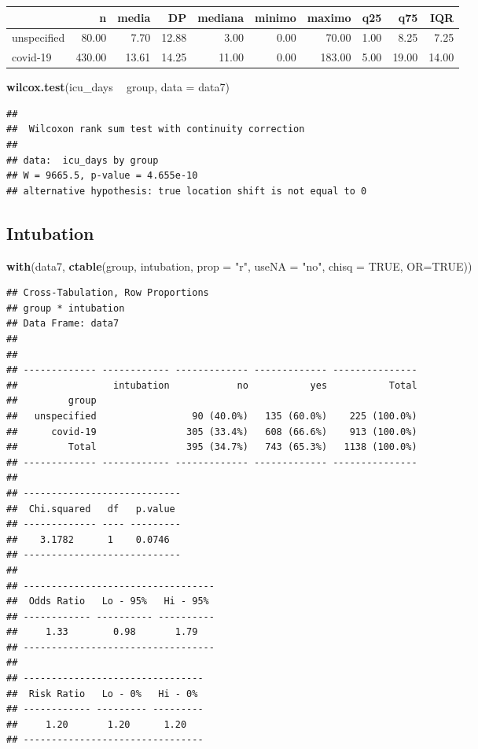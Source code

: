 \documentclass[
]{article}
\newenvironment{Shaded}{\begin{snugshade}}{\end{snugshade}}
\newcommand{\DataTypeTok}[1]{\textcolor[rgb]{0.13,0.29,0.53}{#1}}
\newcommand{\KeywordTok}[1]{\textcolor[rgb]{0.13,0.29,0.53}{\textbf{#1}}}
\newcommand{\NormalTok}[1]{#1}
\newcommand{\OperatorTok}[1]{\textcolor[rgb]{0.81,0.36,0.00}{\textbf{#1}}}
\newcommand{\OtherTok}[1]{\textcolor[rgb]{0.56,0.35,0.01}{#1}}
\newcommand{\StringTok}[1]{\textcolor[rgb]{0.31,0.60,0.02}{#1}}
\begin{document}
\begin{longtable}[]{@{}lrrrrrrrrr@{}}
\toprule
& n & media & DP & mediana & minimo & maximo & q25 & q75 &
IQR\tabularnewline
\midrule
\endhead
unspecified & 80.00 & 7.70 & 12.88 & 3.00 & 0.00 & 70.00 & 1.00 & 8.25 &
7.25\tabularnewline
covid-19 & 430.00 & 13.61 & 14.25 & 11.00 & 0.00 & 183.00 & 5.00 & 19.00
& 14.00\tabularnewline
\bottomrule
\end{longtable}

\begin{Shaded}
\begin{Highlighting}[]
\KeywordTok{wilcox.test}\NormalTok{(icu_days }\OperatorTok{~}\StringTok{ }\NormalTok{group, }\DataTypeTok{data =}\NormalTok{ data7)}
\end{Highlighting}
\end{Shaded}

\begin{verbatim}
## 
##  Wilcoxon rank sum test with continuity correction
## 
## data:  icu_days by group
## W = 9665.5, p-value = 4.655e-10
## alternative hypothesis: true location shift is not equal to 0
\end{verbatim}

\hypertarget{intubation}{%
\subsection{Intubation}\label{intubation}}

\begin{Shaded}
\begin{Highlighting}[]
\KeywordTok{with}\NormalTok{(data7, }\KeywordTok{ctable}\NormalTok{(group, intubation, }\DataTypeTok{prop =} \StringTok{"r"}\NormalTok{, }\DataTypeTok{useNA =} \StringTok{"no"}\NormalTok{, }\DataTypeTok{chisq =} \OtherTok{TRUE}\NormalTok{, }\DataTypeTok{OR=}\OtherTok{TRUE}\NormalTok{))}
\end{Highlighting}
\end{Shaded}

\begin{verbatim}
## Cross-Tabulation, Row Proportions  
## group * intubation  
## Data Frame: data7  
## 
## 
## ------------- ------------ ------------- ------------- ---------------
##                 intubation            no           yes           Total
##         group                                                         
##   unspecified                 90 (40.0%)   135 (60.0%)    225 (100.0%)
##      covid-19                305 (33.4%)   608 (66.6%)    913 (100.0%)
##         Total                395 (34.7%)   743 (65.3%)   1138 (100.0%)
## ------------- ------------ ------------- ------------- ---------------
## 
## ----------------------------
##  Chi.squared   df   p.value 
## ------------- ---- ---------
##    3.1782      1    0.0746  
## ----------------------------
## 
## ----------------------------------
##  Odds Ratio   Lo - 95%   Hi - 95% 
## ------------ ---------- ----------
##     1.33        0.98       1.79   
## ----------------------------------
## 
## --------------------------------
##  Risk Ratio   Lo - 0%   Hi - 0% 
## ------------ --------- ---------
##     1.20       1.20      1.20   
## --------------------------------
\end{verbatim}
\end{document}

